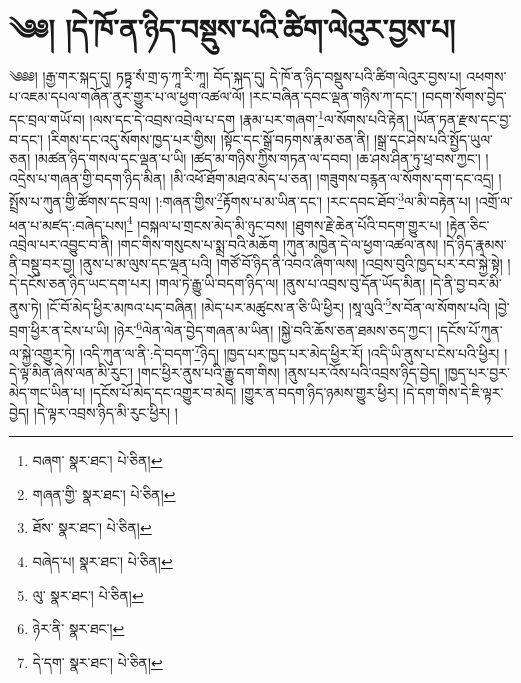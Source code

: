 \setcounter{footnote}{0} 
\chapter{༄༅། །དེ་ཁོ་ན་ཉིད་བསྡུས་པའི་ཚིག་ལེའུར་བྱས་པ།}༄༅༅། །རྒྱ་གར་སྐད་དུ། ཏཏྟྭ་སཾ་གྲ་ཧ་ཀཱ་རི་ཀཱ། བོད་སྐད་དུ། དེ་ཁོ་ན་ཉིད་བསྡུས་པའི་ཚིག་ལེའུར་བྱས་པ། འཕགས་པ་འཇམ་དཔལ་གཞོན་ནུར་གྱུར་པ་ལ་ཕྱག་འཚལ་ལོ། །རང་བཞིན་དབང་ལྡན་གཉིས་ཀ་དང་། །བདག་སོགས་བྱེད་དང་བྲལ་གཡོ་བ། །ལས་དང་དེ་འབྲས་འབྲེལ་པ་དག །རྣམ་པར་གཞག་\footnote{བཞག་  སྣར་ཐང་།  པེ་ཅིན། }ལ་སོགས་པའི་རྟེན། །ཡོན་ཏན་རྫས་དང་བྱ་བ་དང་། །རིགས་དང་འདུ་སོགས་ཁྱད་པར་གྱིས། །སྟོང་དང་སྒྲོ་བཏགས་རྣམ་ཅན་ནི། །སྒྲ་དང་ཤེས་པའི་སྤྱོད་ཡུལ་ཅན། །མཚན་ཉིད་གསལ་དང་ལྡན་པ་ཡི། །ཚད་མ་གཉིས་ཀྱིས་གཏན་ལ་དབབ། །ཆ་ཤས་ཤིན་ཏུ་ཕྲ་བས་ཀྱང་། །འདྲེས་པ་གཞན་གྱི་བདག་ཉིད་མིན། །མི་འཕོ་ཐོག་མཐའ་མེད་པ་ཅན། །གཟུགས་བརྙན་ལ་སོགས་དག་དང་འདྲ། །སྤྲོས་པ་ཀུན་གྱི་ཚོགས་དང་བྲལ། །:གཞན་གྱིས་\footnote{གཞན་གྱི་  སྣར་ཐང་།  པེ་ཅིན། }རྟོགས་པ་མ་ཡིན་དང་། །རང་དབང་ཐོབ་\footnote{ཐོས་  སྣར་ཐང་།  པེ་ཅིན། }ལ་མི་བརྟེན་པ། །འགྲོ་ལ་ཕན་པ་མཛད་:བཞེད་པས།\footnote{བཞེད་པ།  སྣར་ཐང་།  པེ་ཅིན། } །བསྐལ་པ་གྲངས་མེད་མི་ཉུང་བས། །ཐུགས་རྗེ་ཆེན་པོའི་བདག་གྱུར་པ། །རྟེན་ཅིང་འབྲེལ་པར་འབྱུང་བ་ནི། །གང་གིས་གསུངས་པ་སྨྲ་བའི་མཆོག །ཀུན་མཁྱེན་དེ་ལ་ཕྱག་འཚལ་ནས། །དེ་ཉིད་རྣམས་ནི་བསྡུ་བར་བྱ། །ནུས་པ་མ་ལུས་དང་ལྡན་པའི། །གཙོ་བོ་ཉིད་ནི་འབའ་ཞིག་ལས། །འབྲས་བུའི་ཁྱད་པར་རབ་སྐྱེ་སྟེ། །དེ་དངོས་ཅན་ཉིད་ཡང་དག་པར། །གལ་ཏེ་རྒྱུ་ཡི་བདག་ཉིད་ལ། །ནུས་པ་འབྲས་བུ་དོན་ཡོད་མིན། །དེ་ནི་བྱ་བར་མི་ནུས་ཏེ། །ངོ་བོ་མེད་ཕྱིར་མཁའ་པད་བཞིན། །མེད་པར་མཚུངས་ན་ཅི་ཡི་ཕྱིར། །སཱ་ལུའི་\footnote{ལུ་  སྣར་ཐང་།  པེ་ཅིན། }ས་བོན་ལ་སོགས་པའི། །བྱེ་བྲག་ཕྱིར་ན་ངེས་པ་ཡི། །ཉེར་\footnote{ཉེར་ནི་  སྣར་ཐང་། }ལེན་ལེན་བྱེད་གཞན་མ་ཡིན། །སྐྱེ་བའི་ཆོས་ཅན་ཐམས་ཅད་ཀྱང་། །དངོས་པོ་ཀུན་ལ་སྐྱེ་འགྱུར་ཏེ། །འདི་ཀུན་ལ་ནི་:དེ་བདག་\footnote{དེ་དག་  སྣར་ཐང་།  པེ་ཅིན། }ཉིད། །ཁྱད་པར་ཁྱད་པར་མེད་ཕྱིར་རོ། །འདི་ཡི་ནུས་པ་ངེས་པའི་ཕྱིར། །དེ་ལྟ་མིན་ཞེས་ལན་མི་རུང་། །གང་ཕྱིར་ནུས་པའི་རྒྱུ་དག་གིས། །ནུས་པར་འོས་པའི་འབྲས་ཉིད་བྱེད། །ཁྱད་པར་བྱར་མེད་གང་ཡིན་པ། །དངོས་པོ་མེད་དང་འགྱུར་བ་མེད། །གྱུར་ན་བདག་ཉིད་ཉམས་གྱུར་ཕྱིར། །དེ་དག་གིས་དེ་ཇི་ལྟར་བྱེད། །དེ་ལྟར་འབྲས་ཉིད་མི་རུང་ཕྱིར། །
